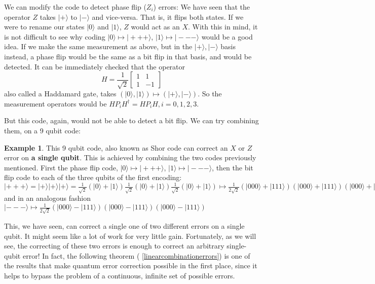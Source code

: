\documentclass{article}
\theoremstyle{definition}
\newtheorem{ex}[Satz]{Example}
\begin{document}
We can modify the code to detect phase flip ($Z_i$) errors: We have seen that the operator $Z$ takes $ | + \rangle$ to $| - \rangle$ and vice-versa. That is, it flips both states. If we were to rename our states $ | 0 \rangle$ and $|1\rangle$, $Z$ would act as an $X$.
With this in mind, it is not difficult to see why coding $ |0\rangle \mapsto | +++ \rangle$,  $|1 \rangle \mapsto | --- \rangle$ would be a good idea. If we make the same measurement as above, but in the $ | + \rangle, | - \rangle$ basis instead, 
a phase flip would be the same as a bit flip in that basis, and would be detected. It can be immediately checked that the operator \[ H = \frac{1}{\sqrt{2}} \left[ \begin{array}{cc}
 1 & 1 \\
 1 & -1 \end{array} \right] \] also called a Haddamard gate, takes $ (|0\rangle, |1\rangle) \mapsto (|+\rangle , | - \rangle )$. So the measurement operators would be $ H P_i H^\dagger = H P_i H, i = 0,1,2,3$.

But this code, again, would not be able to detect a bit flip. We can try combining them, on a 9 qubit code:

\begin{ex}\label{shorcode}
This 9 qubit code, also known as Shor code \cite{NC} can correct an  $X$ or $Z$ error on \textbf{a single qubit}. This is achieved by combining the two codes previously mentioned.
First the phase flip code, $ |0\rangle \mapsto | +++ \rangle$,  $|1 \rangle \mapsto | --- \rangle$, then the bit flip code to each of the three qubits of the first encoding:
$ |+++\rangle = |+\rangle |+\rangle |+ \rangle = \frac{1}{\sqrt{2}}(|0\rangle + |1\rangle) \frac{1}{\sqrt{2}}(|0\rangle + |1\rangle) \frac{1}{\sqrt{2}}(|0\rangle + |1\rangle) \mapsto \frac{1}{2 \sqrt{2}} (|000\rangle + |111 \rangle) (|000\rangle + |111 \rangle) (|000\rangle + |111 \rangle)$ and 
in an analogous fashion $ |--- \rangle \mapsto  \frac{1}{2 \sqrt{2}} (|000\rangle - |111 \rangle) (|000\rangle - |111 \rangle) (|000\rangle - |111 \rangle)$
\end{ex}


This, we have seen, can correct a single one of two different errors on a single qubit. It might seem like a lot of work for very little gain. 
Fortunately, as we will see, the correcting of these two errors is enough to correct an arbitrary single-qubit error!
In fact, the following theorem ( \ref{linearcombinationerrors}) is one of the results that make quantum error correction possible in the first place, since it helps to bypass the problem of a continuous, infinite set of possible errors.
\end{document}
